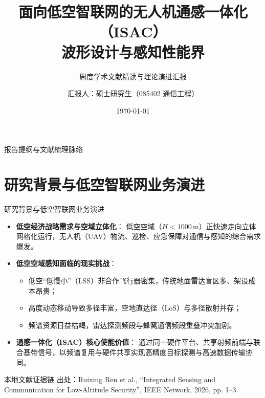 \documentclass[aspectratio=169, 10pt]{ctexbeamer}
\title[ISAC 前沿进展：波形设计与感知性能界]{面向低空智联网的无人机通感一体化（ISAC）\\波形设计与感知性能界}
\subtitle{周度学术文献精读与理论演进汇报}
\author[硕士研究生]{汇报人：硕士研究生（085402 通信工程）}
\institute[BUPT]{北京邮电大学 信息与通信工程学院}
\date{\today}
\begin{document}
\begin{frame}
  \titlepage
\end{frame}

\begin{frame}{报告提纲与文献梳理脉络}
  \tableofcontents
\end{frame}

\section{研究背景与低空智联网业务演进}
\begin{frame}{研究背景与低空智联网业务演进}
  \begin{itemize}
    \item \textbf{低空经济战略需求与空域立体化}：
    低空空域（$H < 1000$\,m）正快速走向立体网格化运行，无人机（UAV）物流、巡检、应急保障对通信与感知的综合需求爆发。
    \item \textbf{低空空域感知面临的现实挑战}：
    \begin{itemize}
      \item 低空“低慢小”（LSS）非合作飞行器密集，传统地面雷达盲区多、架设成本昂贵；
      \item 高度动态移动导致多径丰富，空地直达径（LoS）与多径散射并存；
      \item 频谱资源日益枯竭，雷达探测频段与蜂窝通信频段重叠冲突加剧。
    \end{itemize}
    \item \textbf{通感一体化（ISAC）核心使能价值}：
    通过同一硬件平台、共享射频前端与联合基带信号，以频谱复用与硬件共享实现高精度目标探测与高速数据传输协同。
  \end{itemize}

  \begin{block}{本地文献证据链}
    \footnotesize \textcolor{evidencegray}{出处：Ruixing Ren et al., ``Integrated Sensing and Communication for Low-Altitude Security'', IEEE Network, 2026, pp. 1--3.}
  \end{block}
\end{frame}
\end{document}
